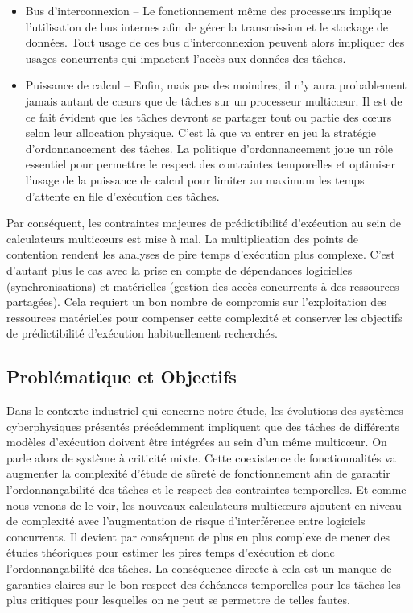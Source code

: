 \documentclass[french, a4paper, 11pt, twoside, pdftex]{StyleThese}
\begin{document}
\begin{itemize}
		\item Bus d'interconnexion -- 
			Le fonctionnement même des processeurs implique l'utilisation de bus internes afin de gérer la transmission et le stockage de données. Tout usage de ces bus d'interconnexion peuvent alors impliquer des usages concurrents qui impactent l'accès aux données des tâches.
		\item Puissance de calcul -- 
			Enfin, mais pas des moindres, il n'y aura probablement jamais autant de cœurs que de tâches sur un processeur multicœur. Il est de ce fait évident que les tâches devront se partager tout ou partie des cœurs selon leur allocation physique. C'est là que va entrer en jeu la stratégie d'ordonnancement des tâches. La politique d'ordonnancement joue un rôle essentiel pour permettre le respect des contraintes temporelles et optimiser l'usage de la puissance de calcul pour limiter au maximum les temps d'attente en file d'exécution des tâches. 
	\end{itemize}

	Par conséquent, les contraintes majeures de prédictibilité d'exécution au sein de calculateurs multicœurs est mise à mal. La multiplication des points de contention rendent les analyses de pire temps d'exécution plus complexe. C'est d'autant plus le cas avec la prise en compte de dépendances logicielles (synchronisations) et matérielles (gestion des accès concurrents à des ressources partagées). Cela requiert un bon nombre de compromis sur l'exploitation des ressources matérielles pour compenser cette complexité et conserver les objectifs de prédictibilité d'exécution habituellement recherchés.

\subsection{Problématique et Objectifs}
		Dans le contexte industriel qui concerne notre étude, les évolutions des systèmes cyberphysiques présentés précédemment impliquent que des tâches de différents modèles d'exécution doivent être intégrées au sein d'un même multicœur. On parle alors de système à criticité mixte. Cette coexistence de fonctionnalités va augmenter la complexité d'étude de sûreté de fonctionnement afin de garantir l'ordonnançabilité des tâches et le respect des contraintes temporelles. Et comme nous venons de le voir, les nouveaux calculateurs multicœurs ajoutent en niveau de complexité avec l'augmentation de risque d'interférence entre logiciels concurrents. Il devient par conséquent de plus en plus complexe de mener des études théoriques pour estimer les pires temps d'exécution et donc l'ordonnançabilité des tâches. La conséquence directe à cela est un manque de garanties claires sur le bon respect des échéances temporelles pour les tâches les plus critiques pour lesquelles on ne peut se permettre de telles fautes.
		
\end{document}
